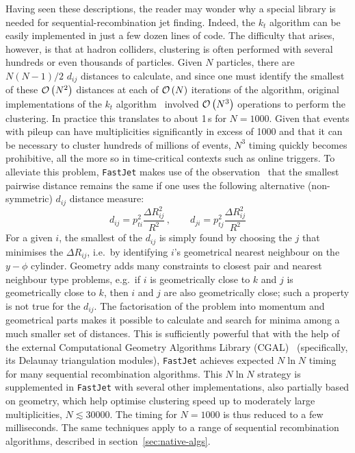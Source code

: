 \documentclass[12pt,a4]{article}
\newcommand{\fastjet}{\texttt{FastJet}\xspace}
\newcommand{\order}[1]{{\cal O}\left(#1\right)}
\begin{document}
Having seen these descriptions, the reader may wonder why a special
library is needed for sequential-recombination jet finding. 
%
Indeed, the $k_t$ algorithm can be easily implemented in just a few
dozen lines of code.
%
The difficulty that arises, however, is that at hadron colliders,
clustering is often performed with several hundreds or even thousands
of particles.
% 
Given $N$ particles, there are $N(N-1)/2$ $d_{ij}$ distances to
calculate, and since one must identify the smallest of these
$\order{N^2}$ distances at each of $\order{N}$ iterations of the
algorithm, original implementations of the $k_t$
algorithm~\cite{KtClus,KtJet} involved $\order{N^3}$ operations to
perform the clustering.
%
In practice this translates to about 1\,s for $N=1000$. Given that
events with pileup can have multiplicities significantly in excess of
1000 and that it can be necessary to cluster hundreds of millions of
events, $N^3$ timing quickly becomes prohibitive, all the more so in
time-critical contexts such as online triggers.
%
To alleviate this problem, \fastjet makes use of the
observation~\cite{fastjet} that the smallest pairwise distance remains
the same if one uses the following alternative (non-symmetric)
$d_{ij}$ distance measure:
\begin{equation}
  \label{eq:dij-illustr-asym}
  d_{ij} = p_{ti}^2 \frac{\Delta R_{ij}^2}{R^2}\,,\qquad
  d_{ji} = p_{tj}^2 \frac{\Delta R_{ij}^2}{R^2}
\end{equation}
For a given $i$, the smallest of the $d_{ij}$ is simply found by
choosing the $j$ that minimises the $\Delta R_{ij}$, i.e.\ by
identifying $i$'s geometrical nearest neighbour on the $y-\phi$
cylinder.
%
Geometry adds many constraints to closest pair and nearest neighbour
type problems, e.g.\ if $i$ is geometrically close to $k$ and $j$ is
geometrically close to $k$, then $i$ and $j$ are also geometrically
close; such a property is not true for the $d_{ij}$. The factorisation
of the problem into momentum and geometrical parts makes it possible
to calculate and search for minima among a much smaller set of
distances.
%
This is sufficiently powerful that with the help of the external
Computational Geometry Algorithms Library (CGAL)~\cite{CGAL}
(specifically, its Delaunay triangulation modules), \fastjet achieves
expected $N\ln N$ timing for many sequential recombination algorithms.
%
This $N\ln N$ strategy is supplemented in \fastjet with several other
implementations, also partially based on geometry, which help optimise
clustering speed up to moderately large multiplicities, $N \lesssim
30000$.
%
The timing for $N=1000$ is thus reduced to a few milliseconds.
%
The same techniques apply to a range of sequential recombination
algorithms, described in section~\ref{sec:native-algs}.
\end{document}
